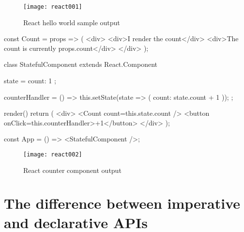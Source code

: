 \begin{figure}
  \centering
  \texttt{[image: react001]}
  \caption{React hello world sample output}
  \label{fig:reactHelloWorld}
\end{figure}

\begin{program}
\caption{Simple example of a React component and its usage} 
\label{prog:reactStatefulComponent}
\begin{JsCode}
const Count = props => (
  <div>
    <div>I render the count</div>
    <div>The count is currently {props.count}</div>
  </div>
);

class StatefulComponent extends React.Component {
  state = {
    count: 1
  };

  counterHandler = () => {
    this.setState(state => ({ count: state.count + 1 }));
  };

  render() {
    return (
      <div>
        <Count count={this.state.count} />
        <button onClick={this.counterHandler}>+1</button>
      </div>
    );
  }
}

const App = () => <StatefulComponent />;
\end{JsCode}
\end{program}

\begin{figure}
  \centering
  \texttt{[image: react002]}
  \caption{React counter component output}
  \label{fig:reactCounterComponent}
\end{figure}



\section{The difference between imperative and declarative APIs}


